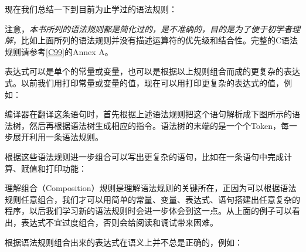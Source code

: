 现在我们总结一下到目前为止学过的语法规则：


\begin{BookLiteral}
\end{BookLiteral}


注意，\emph{本书所列的语法规则都是简化过的，是不准确的，目的是为了便于初学者理解}，比如上面所列的语法规则并没有描述运算符的优先级和结合性。完整的C语法规则请参考\hyperlink{db.bi01.bibli.c99}{[C99]}的Annex A。



表达式可以是单个的常量或变量，也可以是根据以上规则组合而成的更复杂的表达式。以前我们用打印常量或变量的值，现在可以用打印更复杂的表达式的值，例如：




编译器在翻译这条语句时，首先根据上述语法规则把这个语句解析成下图所示的语法树，然后再根据语法树生成相应的指令。语法树的末端的是一个个Token，每一步展开利用一条语法规则。




根据这些语法规则进一步组合可以写出更复杂的语句，比如在一条语句中完成计算、赋值和打印功能：




理解组合（Composition）规则是理解语法规则的关键所在，正因为可以根据语法规则任意组合，我们才可以用简单的常量、变量、表达式、语句搭建出任意复杂的程序，以后我们学习新的语法规则时会进一步体会到这一点。从上面的例子可以看出，表达式不宜过度组合，否则会给阅读和调试带来困难。



根据语法规则组合出来的表达式在语义上并不总是正确的，例如：


